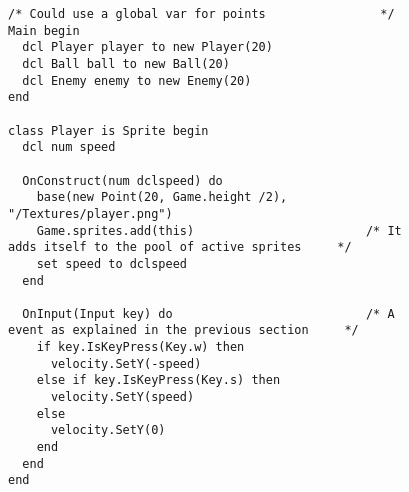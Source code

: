 


\begin{figure}[H]
    \centering
    \begin{lstlisting}[style=gglang]
                                                  /* Could use a global var for points                */
Main begin
  dcl Player player to new Player(20) 
  dcl Ball ball to new Ball(20)
  dcl Enemy enemy to new Enemy(20)
end

class Player is Sprite begin
  dcl num speed

  OnConstruct(num dclspeed) do 
    base(new Point(20, Game.height /2), "/Textures/player.png")
    Game.sprites.add(this)                        /* It adds itself to the pool of active sprites     */            
    set speed to dclspeed
  end

  OnInput(Input key) do                           /* A event as explained in the previous section     */
    if key.IsKeyPress(Key.w) then
      velocity.SetY(-speed)
    else if key.IsKeyPress(Key.s) then
      velocity.SetY(speed)
    else
      velocity.SetY(0)
    end
  end
end



    \end{lstlisting}
\end{figure}

